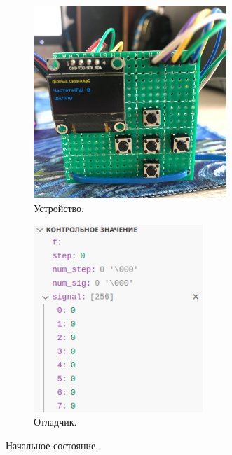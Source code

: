 	\begin{figure}[H]\captionsetup[subfigure]{font=normalsize}
     \begin{subfigure}[H]{0.5\textwidth}
         \centering
         \includegraphics[width=0.8\textwidth]{../image/test0_u_s.jpg}
         \caption{Устройство.}
     \end{subfigure}
     \hfill
     \begin{subfigure}[H]{0.5\textwidth}
         \centering
         \includegraphics[width=0.7\textwidth]{../image/test0_o_s.png}
         \caption{Отладчик.}
     \end{subfigure}
        \caption{Начальное состояние.}
	\end{figure}
	
